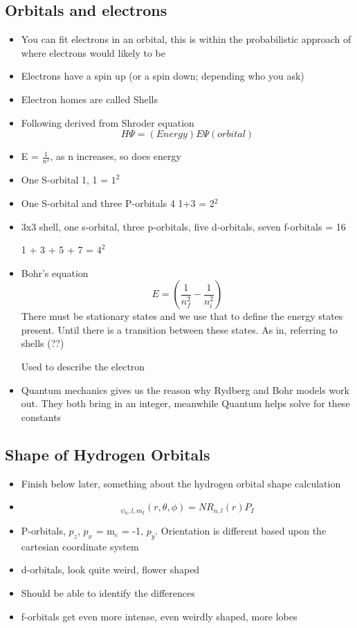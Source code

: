 \documentclass{article}
\begin{document}
\subsection{Orbitals and electrons}
\begin{itemize}
  \item You can fit electrons in an orbital, this is within the probabilistic approach of where
    electrons would likely to be
  \item Electrons have a spin up (or a spin down; depending who you ask)
  \item Electron homes are called Shells
  \item Following derived from Shroder equation
    $$ H \Psi{}  = (Energy) E \Psi{} (orbital) $$
  \item E = $\frac{1}{n^2} $, as n increases, so does energy
  \item One S-orbital 1, 1 = $1^2 $
  \item One S-orbital and three P-orbitals 4 \rightarrow{} 1+3 = 2$^2$
  \item 3x3 shell, one s-orbital, three p-orbitals, five d-orbitals, seven f-orbitals = 16

    \rightarrow{} 1 + 3 + 5 + 7 = $4^2$
  \item Bohr's equation
    $$E = (\frac{1}{n_f^2} - \frac{1}{n_i^2}) $$
    There must be stationary states and we use that to define the energy states present. Until there is a transition
    between these states. As in, referring to shells (??)

    Used to describe the electron
  \item Quantum mechanics gives us the reason why Rydberg and Bohr models work out.
    They both bring in an integer, meanwhile Quantum helps solve for these constants
\end{itemize}

\subsection{Shape of Hydrogen Orbitals}
\begin{itemize}
  \item Finish below later, something about the hydrogen orbital shape calculation
  \item $${}_{\psi{}_n,l,m_I}(r, \theta{}, \phi{}) = NR_{n,l} (r) P_I $$
  \item P-orbitals, $p_z$, $p_x$ = m$_e$ = -1, $p_y$. Orientation is different based upon the cartesian coordinate system
  \item d-orbitals, look quite weird, flower shaped
  \item Should be able to identify the differences
  \item f-orbitals get even more intense, even weirdly shaped, more lobes
\end{itemize}
\end{document}
